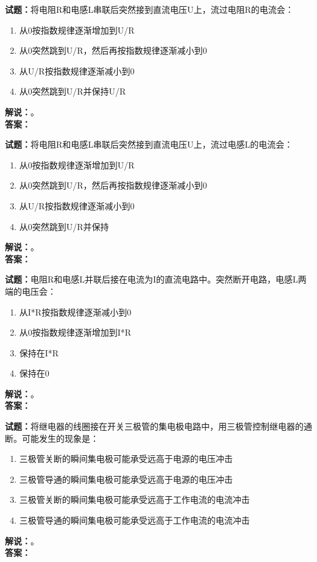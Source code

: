 \documentclass{ctexbook}
\begin{document}
\bigskip




\noindent\textbf{试题：}将电阻R和电感L串联后突然接到直流电压U上，流过电阻R的电流会：
\begin{enumerate}[leftmargin=3em]
\item 从0按指数规律逐渐增加到U/R
\item 从0突然跳到U/R，然后再按指数规律逐渐减小到0
\item 从U/R按指数规律逐渐减小到0
\item 从0突然跳到U/R并保持U/R
\end{enumerate}
\noindent\textbf{解说：}\textbf{}。\\\noindent\textbf{答案：}

\bigskip




\noindent\textbf{试题：}将电阻R和电感L串联后突然接到直流电压U上，流过电感L的电流会：
\begin{enumerate}[leftmargin=3em]
\item 从0按指数规律逐渐增加到U/R
\item 从0突然跳到U/R，然后再按指数规律逐渐减小到0
\item 从U/R按指数规律逐渐减小到0
\item 从0突然跳到U/R并保持
\end{enumerate}
\noindent\textbf{解说：}\textbf{}。\\\noindent\textbf{答案：}

\bigskip




\noindent\textbf{试题：}电阻R和电感L并联后接在电流为I的直流电路中。突然断开电路，电感L两端的电压会：
\begin{enumerate}[leftmargin=3em]
\item 从I*R按指数规律逐渐减小到0
\item 从0按指数规律逐渐增加到I*R
\item 保持在I*R
\item 保持在0
\end{enumerate}
\noindent\textbf{解说：}\textbf{}。\\\noindent\textbf{答案：}

\bigskip




\noindent\textbf{试题：}将继电器的线圈接在开关三极管的集电极电路中，用三极管控制继电器的通断。可能发生的现象是：
\begin{enumerate}[leftmargin=3em]
\item 三极管关断的瞬间集电极可能承受远高于电源的电压冲击
\item 三极管导通的瞬间集电极可能承受远高于电源的电压冲击
\item 三极管关断的瞬间集电极可能承受远高于工作电流的电流冲击
\item 三极管导通的瞬间集电极可能承受远高于工作电流的电流冲击
\end{enumerate}
\noindent\textbf{解说：}\textbf{}。\\\noindent\textbf{答案：}
\end{document}
